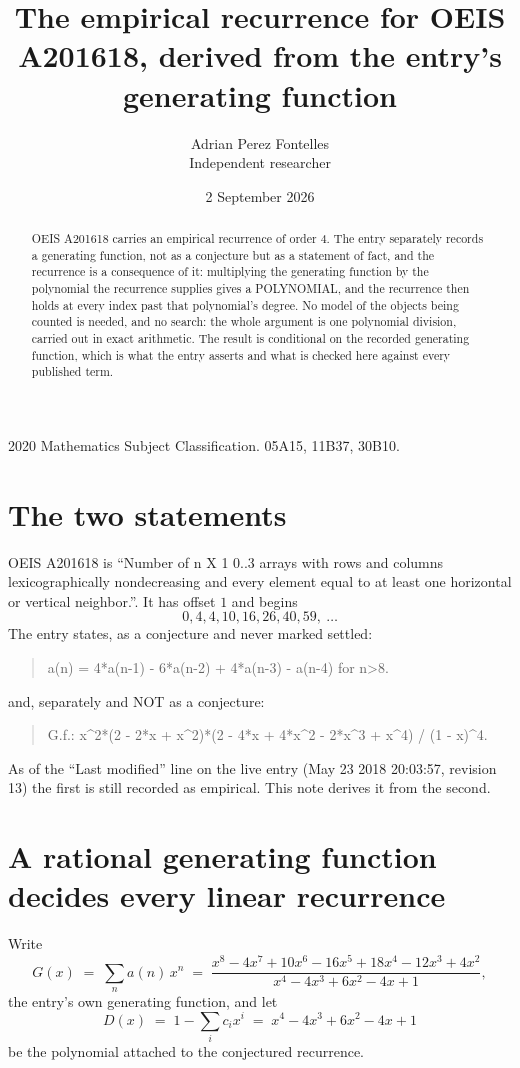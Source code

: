 \documentclass[11pt,a4paper]{article}
\title{The empirical recurrence for OEIS A201618, derived from the entry's generating function}
\author{Adrian Perez Fontelles\\ \small Independent researcher}
\date{2 September 2026}
\theoremstyle{plain}
\theoremstyle{definition}
\begin{document}
\maketitle

\begin{abstract}
OEIS A201618 carries an empirical recurrence of order $4$. The entry separately records a
generating function, not as a conjecture but as a statement of fact, and the recurrence is a
consequence of it: multiplying the generating function by the polynomial the recurrence
supplies gives a POLYNOMIAL, and the recurrence then holds at every index past that
polynomial's degree. No model of the objects being counted is needed, and no search: the
whole argument is one polynomial division, carried out in exact arithmetic. The result is
conditional on the recorded generating function, which is what the entry asserts and what is
checked here against every published term.
\end{abstract}

\noindent\small 2020 Mathematics Subject Classification. 05A15, 11B37, 30B10.\normalsize

\section{The two statements}

OEIS A201618 is ``Number of n X 1 0..3 arrays with rows and columns lexicographically nondecreasing and every element equal to at least one horizontal or vertical neighbor.''. It has offset $1$ and begins
\[
0, 4, 4, 10, 16, 26, 40, 59,\ \dots
\]
The entry states, as a conjecture and never marked settled:
\begin{quote}
a(n) = 4*a(n-1) - 6*a(n-2) + 4*a(n-3) - a(n-4) for n>8.
\end{quote}
and, separately and NOT as a conjecture:
\begin{quote}
G.f.: x\^{}2*(2 - 2*x + x\^{}2)*(2 - 4*x + 4*x\^{}2 - 2*x\^{}3 + x\^{}4) / (1 - x)\^{}4.
\end{quote}
As of the ``Last modified'' line on the live entry (May 23 2018 20:03:57, revision 13) the first is still
recorded as empirical. This note derives it from the second.

\section{A rational generating function decides every linear recurrence}

Write
\[
G(x)\;=\;\sum_{n}a(n)\,x^{n}\;=\;\frac{x^{8} - 4 x^{7} + 10 x^{6} - 16 x^{5} + 18 x^{4} - 12 x^{3} + 4 x^{2}}{x^{4} - 4 x^{3} + 6 x^{2} - 4 x + 1},
\]
the entry's own generating function, and let
\[
D(x)\;=\;1-\sum_i c_i x^{i}\;=\;x^{4} - 4 x^{3} + 6 x^{2} - 4 x + 1
\]
be the polynomial attached to the conjectured recurrence.
\end{document}
